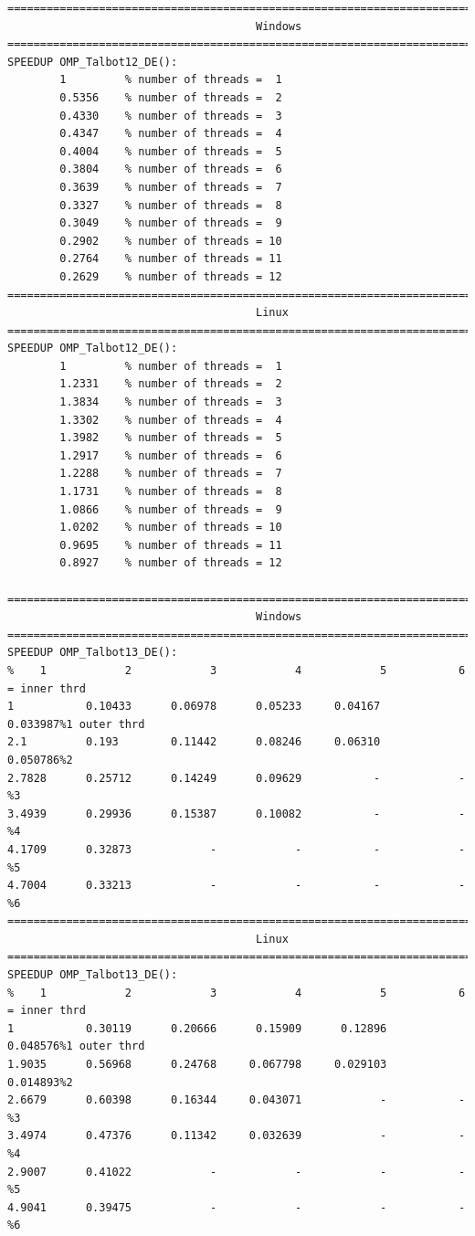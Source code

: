 \documentclass[a4paper,10pt]{report}%
\begin{document}
\begin{lstlisting}
====================================================================================
                                      Windows
====================================================================================
SPEEDUP OMP_Talbot12_DE():
        1         % number of threads =  1
        0.5356    % number of threads =  2
        0.4330    % number of threads =  3
        0.4347    % number of threads =  4
        0.4004    % number of threads =  5
        0.3804    % number of threads =  6
        0.3639    % number of threads =  7
        0.3327    % number of threads =  8
        0.3049    % number of threads =  9
        0.2902    % number of threads = 10
        0.2764    % number of threads = 11
        0.2629    % number of threads = 12
====================================================================================
                                      Linux
====================================================================================
SPEEDUP OMP_Talbot12_DE():
        1         % number of threads =  1
        1.2331    % number of threads =  2
        1.3834    % number of threads =  3
        1.3302    % number of threads =  4
        1.3982    % number of threads =  5
        1.2917    % number of threads =  6
        1.2288    % number of threads =  7
        1.1731    % number of threads =  8
        1.0866    % number of threads =  9
        1.0202    % number of threads = 10
        0.9695    % number of threads = 11
        0.8927    % number of threads = 12

====================================================================================
                                      Windows
====================================================================================
SPEEDUP OMP_Talbot13_DE():
%    1            2            3            4            5           6 = inner thrd
1           0.10433      0.06978      0.05233     0.04167     0.033987%1 outer thrd
2.1         0.193        0.11442      0.08246     0.06310     0.050786%2
2.7828      0.25712      0.14249      0.09629           -            -%3
3.4939      0.29936      0.15387      0.10082           -            -%4
4.1709      0.32873            -            -           -            -%5
4.7004      0.33213            -            -           -            -%6
====================================================================================
                                      Linux
====================================================================================
SPEEDUP OMP_Talbot13_DE():
%    1            2            3            4            5           6 = inner thrd
1           0.30119      0.20666      0.15909      0.12896    0.048576%1 outer thrd
1.9035      0.56968      0.24768     0.067798     0.029103    0.014893%2
2.6679      0.60398      0.16344     0.043071            -           -%3
3.4974      0.47376      0.11342     0.032639            -           -%4
2.9007      0.41022            -            -            -           -%5
4.9041      0.39475            -            -            -           -%6
\end{lstlisting}
\end{document}
